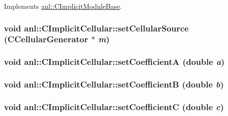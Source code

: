 Implements \hyperlink{classanl_1_1CImplicitModuleBase_ab88f8a1822dcfbc13ba5230318b0acd1}{anl::CImplicitModuleBase}.\hypertarget{classanl_1_1CImplicitCellular_a646bdd9bebf686f8205b1da6d643a26c}{
\subsubsection[{setCellularSource}]{\setlength{\rightskip}{0pt plus 5cm}void anl::CImplicitCellular::setCellularSource ({\bf CCellularGenerator} $\ast$ {\em m})}}
\label{classanl_1_1CImplicitCellular_a646bdd9bebf686f8205b1da6d643a26c}
\hypertarget{classanl_1_1CImplicitCellular_a1ae398cefbc7591dc9848018aafd74f6}{
\subsubsection[{setCoefficientA}]{\setlength{\rightskip}{0pt plus 5cm}void anl::CImplicitCellular::setCoefficientA (double {\em a})}}
\label{classanl_1_1CImplicitCellular_a1ae398cefbc7591dc9848018aafd74f6}
\hypertarget{classanl_1_1CImplicitCellular_a3edf13d700a3855f1b40ad49e558a21e}{
\subsubsection[{setCoefficientB}]{\setlength{\rightskip}{0pt plus 5cm}void anl::CImplicitCellular::setCoefficientB (double {\em b})}}
\label{classanl_1_1CImplicitCellular_a3edf13d700a3855f1b40ad49e558a21e}
\hypertarget{classanl_1_1CImplicitCellular_aaf72b746ca8369b452c40a47d308415e}{
\subsubsection[{setCoefficientC}]{\setlength{\rightskip}{0pt plus 5cm}void anl::CImplicitCellular::setCoefficientC (double {\em c})}}
\label{classanl_1_1CImplicitCellular_aaf72b746ca8369b452c40a47d308415e}

